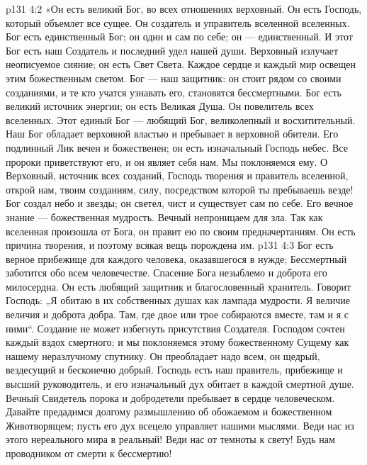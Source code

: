 \vs p131 4:2 \pc «Он есть великий Бог, во всех отношениях верховный. Он есть Господь, который объемлет все сущее. Он создатель и управитель вселенной вселенных. Бог есть единственный Бог; он один и сам по себе; он --- единственный. И этот Бог есть наш Создатель и последний удел нашей души. Верховный излучает неописуемое сияние; он есть Свет Света. Каждое сердце и каждый мир освещен этим божественным светом. Бог --- наш защитник: он стоит рядом со своими созданиями, и те кто учатся узнавать его, становятся бессмертными. Бог есть великий источник энергии; он есть Великая Душа. Он повелитель всех вселенных. Этот единый Бог --- любящий Бог, великолепный и восхитительный. Наш Бог обладает верховной властью и пребывает в верховной обители. Его подлинный Лик вечен и божественен; он есть изначальный Господь небес. Все пророки приветствуют его, и он являет себя нам. Мы поклоняемся ему. О Верховный, источник всех созданий, Господь творения и правитель вселенной, открой нам, твоим созданиям, силу, посредством которой ты пребываешь везде! Бог создал небо и звезды; он светел, чист и существует сам по себе. Его вечное знание --- божественная мудрость. Вечный непроницаем для зла. Так как вселенная произошла от Бога, он правит ею по своим предначертаниям. Он есть причина творения, и поэтому всякая вещь порождена им.
\vs p131 4:3 Бог есть верное прибежище для каждого человека, оказавшегося в нужде; Бессмертный заботится обо всем человечестве. Спасение Бога незыблемо и доброта его милосердна. Он есть любящий защитник и благословенный хранитель. Говорит Господь: „Я обитаю в их собственных душах как лампада мудрости. Я величие величия и доброта добра. Там, где двое или трое собираются вместе, там и я с ними“. Создание не может избегнуть присутствия Создателя. Господом сочтен каждый вздох смертного; и мы поклоняемся этому божественному Сущему как нашему неразлучному спутнику. Он преобладает надо всем, он щедрый, вездесущий и бесконечно добрый. Господь есть наш правитель, прибежище и высший руководитель, и его изначальный дух обитает в каждой смертной душе. Вечный Свидетель порока и добродетели пребывает в сердце человеческом. Давайте предадимся долгому размышлению об обожаемом и божественном Животворящем; пусть его дух всецело управляет нашими мыслями. Веди нас из этого нереального мира в реальный! Веди нас от темноты к свету! Будь нам проводником от смерти к бессмертию!
